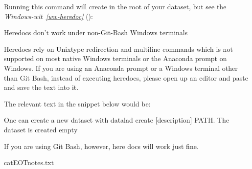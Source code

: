 \sphinxAtStartPar
Running this command will create  in the
root of your  dataset, but see the \textit{Windows-wit}~{\windowswiticoninline}\textit{\ref{ww-heredoc}} {\hyperref[\detokenize{basics/101-103-modify:ww-heredoc}]{}} ():

\ignorespaces \begin{windowswit}[label={ww-heredoc}, before title={\thetcbcounter\ }, float, floatplacement=tb, check odd page=true]{Heredocs don’t work under non-Git-Bash Windows terminals}
\label{\detokenize{basics/101-103-modify:ww-heredoc}}

\sphinxAtStartPar
Heredocs rely on Unix\sphinxhyphen{}type redirection and multi\sphinxhyphen{}line commands \textendash{} which is not supported on most native Windows terminals or the Anaconda prompt on Windows.
If you are using an Anaconda prompt or a Windows terminal other than Git Bash, instead of executing heredocs, please open up an editor and paste and save the text into it.

\sphinxAtStartPar
The relevant text in the snippet below would be:

\begin{sphinxVerbatim}[commandchars=\\\{\}]
One can create a new dataset with \PYGZsq{}datalad create [\PYGZhy{}\PYGZhy{}description] PATH\PYGZsq{}.
The dataset is created empty
\end{sphinxVerbatim}

\sphinxAtStartPar
If you are using Git Bash, however, here docs will work just fine.


\end{windowswit}

\ignorespaces 
\def\sphinxLiteralBlockLabel{\label{\detokenize{basics/101-103-modify:index-2}}}
\begin{sphinxVerbatim}[commandchars=\\\{\}]
cat\PYGZlt{}\PYGZlt{}EOT\PYGZgt{}notes.txt

\end{sphinxVerbatim}

